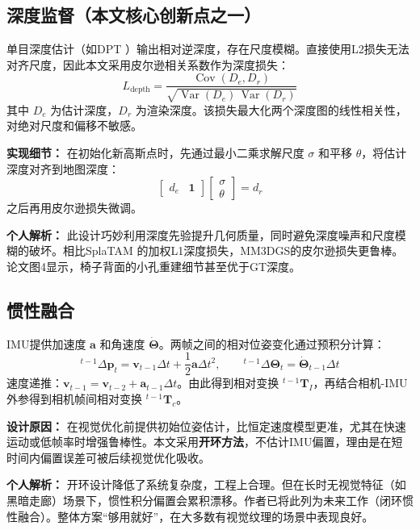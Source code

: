 \documentclass[12pt,a4paper,onecolumn]{article}
\begin{document}
\subsection{深度监督（本文核心创新点之一）}

单目深度估计（如DPT \cite{DPT}）输出相对逆深度，存在尺度模糊。直接使用L2损失无法对齐尺度，因此本文采用皮尔逊相关系数作为深度损失：
\[
L_{\text{depth}} = \frac{\operatorname{Cov}(D_e, D_r)}{\sqrt{\operatorname{Var}(D_e)\,\operatorname{Var}(D_r)}}
\]
其中 $D_e$ 为估计深度，$D_r$ 为渲染深度。该损失最大化两个深度图的线性相关性，对绝对尺度和偏移不敏感。

\textbf{实现细节：} 在初始化新高斯点时，先通过最小二乘求解尺度 $\sigma$ 和平移 $\theta$，将估计深度对齐到地图深度：
\[
\begin{bmatrix} d_e & \mathbf{1} \end{bmatrix} \begin{bmatrix} \sigma \\ \theta \end{bmatrix} = d_r
\]
之后再用皮尔逊损失微调。

\textbf{个人解析：} 此设计巧妙利用深度先验提升几何质量，同时避免深度噪声和尺度模糊的破坏。相比SplaTAM \cite{SplaTAM}的加权L1深度损失，MM3DGS的皮尔逊损失更鲁棒。论文图4显示，椅子背面的小孔重建细节甚至优于GT深度。

\subsection{惯性融合}

IMU提供加速度 $\mathbf{a}$ 和角速度 $\dot{\boldsymbol{\Theta}}$。两帧之间的相对位姿变化通过预积分计算：
\[
^{t-1}\Delta \mathbf{p}_t = \mathbf{v}_{t-1} \Delta t + \frac{1}{2} \mathbf{a} \Delta t^2, \qquad
^{t-1}\Delta \boldsymbol{\Theta}_t = \dot{\boldsymbol{\Theta}}_{t-1} \Delta t
\]
速度递推：$\mathbf{v}_{t-1} = \mathbf{v}_{t-2} + \mathbf{a}_{t-1} \Delta t$。由此得到相对变换 $^{t-1}\mathbf{T}_I$，再结合相机-IMU外参得到相机帧间相对变换 $^{t-1}\mathbf{T}_c$。

\textbf{设计原因：} 在视觉优化前提供初始位姿估计，比恒定速度模型更准，尤其在快速运动或低帧率时增强鲁棒性。本文采用\textbf{开环方法}，不估计IMU偏置，理由是在短时间内偏置误差可被后续视觉优化吸收。

\textbf{个人解析：} 开环设计降低了系统复杂度，工程上合理。但在长时无视觉特征（如黑暗走廊）场景下，惯性积分偏置会累积漂移。作者已将此列为未来工作（闭环惯性融合）。整体方案“够用就好”，在大多数有视觉纹理的场景中表现良好。
\end{document}
